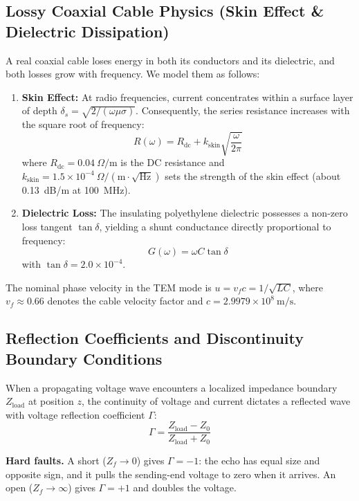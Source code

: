 \subsection{Lossy Coaxial Cable Physics (Skin Effect \& Dielectric Dissipation)}
A real coaxial cable loses energy in both its conductors and its dielectric, and both losses grow with frequency. We model them as follows:
\begin{enumerate}
    \item \textbf{Skin Effect:} At radio frequencies, current concentrates within a surface layer of depth $\delta_s = \sqrt{2/(\omega \mu \sigma)}$. Consequently, the series resistance increases with the square root of frequency:
    \begin{equation}
    R(\omega) = R_{\mathrm{dc}} + k_{\mathrm{skin}} \sqrt{\frac{\omega}{2\pi}}
    \label{eq:skin_effect}
    \end{equation}
    where $R_{\mathrm{dc}} = 0.04\ \Omega/\mathrm{m}$ is the DC resistance and $k_{\mathrm{skin}} = 1.5 \times 10^{-4}\ \Omega/(\mathrm{m}\cdot\sqrt{\mathrm{Hz}})$ sets the strength of the skin effect (about 0.13~dB/m at 100~MHz).
    \item \textbf{Dielectric Loss:} The insulating polyethylene dielectric possesses a non-zero loss tangent $\tan\delta$, yielding a shunt conductance directly proportional to frequency:
    \begin{equation}
    G(\omega) = \omega C \tan\delta
    \label{eq:dielectric_loss}
    \end{equation}
    with $\tan\delta = 2.0 \times 10^{-4}$.
\end{enumerate}
The nominal phase velocity in the TEM mode is $u = v_f c = 1/\sqrt{LC}$, where $v_f \approx 0.66$ denotes the cable velocity factor and $c = 2.9979 \times 10^8\ \mathrm{m/s}$.

\subsection{Reflection Coefficients and Discontinuity Boundary Conditions}
When a propagating voltage wave encounters a localized impedance boundary $Z_{\mathrm{load}}$ at position $z$, the continuity of voltage and current dictates a reflected wave with voltage reflection coefficient $\Gamma$:
\begin{equation}
\Gamma = \frac{Z_{\mathrm{load}} - Z_0}{Z_{\mathrm{load}} + Z_0}
\label{eq:gamma}
\end{equation}

\textbf{Hard faults.} A short ($Z_f \to 0$) gives $\Gamma = -1$: the echo has equal size and opposite sign, and it pulls the sending-end voltage to zero when it arrives. An open ($Z_f \to \infty$) gives $\Gamma = +1$ and doubles the voltage.

